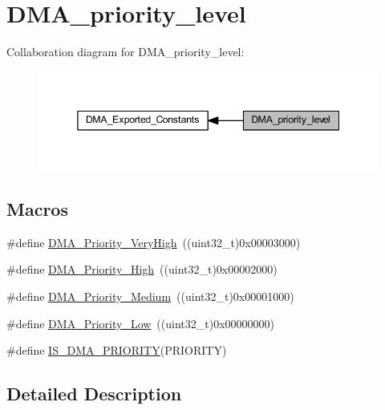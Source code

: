 \hypertarget{group___d_m_a__priority__level}{}\section{D\+M\+A\+\_\+priority\+\_\+level}
\label{group___d_m_a__priority__level}
Collaboration diagram for D\+M\+A\+\_\+priority\+\_\+level\+:
\nopagebreak
\begin{figure}[H]
\begin{center}
\leavevmode
\includegraphics[width=345pt]{group___d_m_a__priority__level}
\end{center}
\end{figure}
\subsection*{Macros}
\begin{DoxyCompactItemize}
\item 
\#define \hyperlink{group___d_m_a__priority__level_gadccd2f8b2ac24ba4fd485dd5b9b48671}{D\+M\+A\+\_\+\+Priority\+\_\+\+Very\+High}~((uint32\+\_\+t)0x00003000)
\item 
\#define \hyperlink{group___d_m_a__priority__level_gae2441c0b4d4ba9945a6f4f7d08045a8e}{D\+M\+A\+\_\+\+Priority\+\_\+\+High}~((uint32\+\_\+t)0x00002000)
\item 
\#define \hyperlink{group___d_m_a__priority__level_ga8e0d4a958f4288c6c759945789490f38}{D\+M\+A\+\_\+\+Priority\+\_\+\+Medium}~((uint32\+\_\+t)0x00001000)
\item 
\#define \hyperlink{group___d_m_a__priority__level_gaf414e0aa8dd42aee6f83f88ab6175179}{D\+M\+A\+\_\+\+Priority\+\_\+\+Low}~((uint32\+\_\+t)0x00000000)
\item 
\#define \hyperlink{group___d_m_a__priority__level_gaa1cae2ab458948511596467c87cd02b6}{I\+S\+\_\+\+D\+M\+A\+\_\+\+P\+R\+I\+O\+R\+I\+TY}(P\+R\+I\+O\+R\+I\+TY)
\end{DoxyCompactItemize}


\subsection{Detailed Description}


